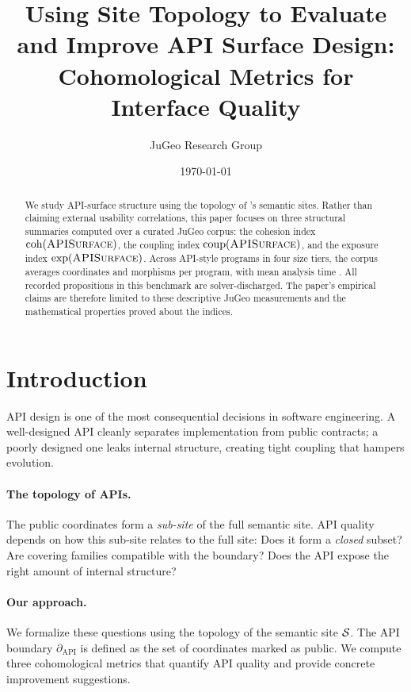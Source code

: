 \documentclass[11pt]{article}
\title{\textbf{Using Site Topology to Evaluate and Improve API Surface Design:\\
Cohomological Metrics for Interface Quality}}
\author{%
  JuGeo Research Group
}
\date{\today}
\newcommand{\APISurface}{\textsc{APISurface}}
\newcommand{\CohIndex}{\mathrm{coh}}
\newcommand{\CoupIndex}{\mathrm{coup}}
\newcommand{\ExpIndex}{\mathrm{exp}}
\newcommand{\APIBoundary}{\partial_{\mathrm{API}}}
\begin{document}
\maketitle

\begin{abstract}
We study API-surface structure using the topology of \JuGeo's semantic sites.
Rather than claiming external usability correlations, this paper focuses on
three structural summaries computed over a curated JuGeo corpus: the cohesion
index $\CohIndex(\APISurface)$, the coupling index
$\CoupIndex(\APISurface)$, and the exposure index
$\ExpIndex(\APISurface)$. Across \ppLXIIprogramCount{} API-style programs in
four size tiers, the corpus averages \ppLXIIcoordsMean{} coordinates and
\ppLXIImorphMean{} morphisms per program, with mean analysis time
\ppLXIItimeMean{}. All \ppLXIIpropsOk{} recorded propositions in this
benchmark are solver-discharged. The paper's empirical claims are therefore
limited to these descriptive JuGeo measurements and the mathematical
properties proved about the indices.
\end{abstract}

\newpage

\section{Introduction}\label{sec:intro}

API design is one of the most consequential decisions in software
engineering.  A well-designed API cleanly separates implementation from
public contracts; a poorly designed one leaks internal structure, creating
tight coupling that hampers evolution.

\paragraph{The topology of APIs.}
The public coordinates form a \emph{sub-site} of the full semantic site.
API quality depends on how this sub-site relates to the full site: Does it
form a \emph{closed} subset?  Are covering families compatible with the
boundary?  Does the API expose the right amount of internal structure?

\paragraph{Our approach.}
We formalize these questions using the topology of the semantic site
$\mathcal{S}$.  The API boundary $\APIBoundary$ is defined as the set of
coordinates marked as public.  We compute three cohomological metrics
that quantify API quality and provide concrete improvement suggestions.
\end{document}
